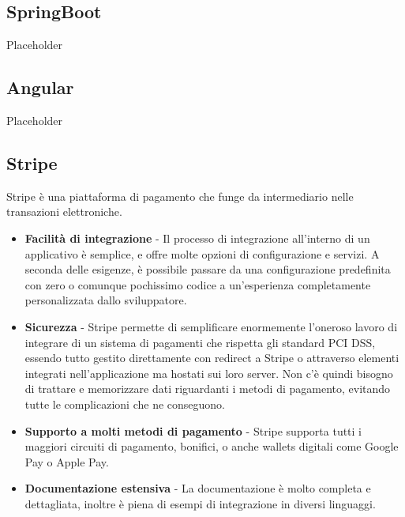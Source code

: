 \subsection {SpringBoot}
Placeholder
\subsection{Angular}
Placeholder
\subsection{Stripe}
Stripe \`e una piattaforma di pagamento che funge da intermediario nelle transazioni elettroniche.

\begin{itemize}
  \item \textbf{Facilit\`a di integrazione} - Il processo di integrazione all'interno di un applicativo \`e semplice, e offre molte opzioni di configurazione e servizi.
    A seconda delle esigenze, \`e possibile passare da una configurazione predefinita con zero o comunque pochissimo codice a un'esperienza completamente personalizzata dallo sviluppatore.
  \item \textbf{Sicurezza} - Stripe permette di semplificare enormemente l'oneroso lavoro di integrare di un sistema di pagamenti che rispetta
    gli standard PCI DSS, essendo tutto gestito direttamente con redirect a Stripe o attraverso elementi integrati nell'applicazione ma hostati sui loro server. Non c'\`e quindi
    bisogno di trattare e memorizzare dati riguardanti i metodi di pagamento, evitando tutte le complicazioni che ne conseguono.
  \item \textbf{Supporto a molti metodi di pagamento} - Stripe supporta tutti i maggiori circuiti di pagamento, bonifici, o anche wallets digitali come Google Pay o Apple Pay.
  \item \textbf{Documentazione estensiva} - La documentazione \`e molto completa e dettagliata, inoltre \`e piena di esempi di integrazione in diversi linguaggi.
\end{itemize}
